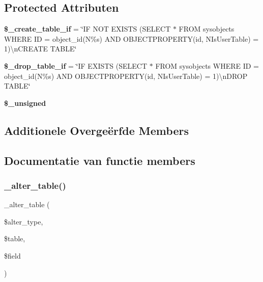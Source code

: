 \subsection*{Protected Attributen}
\begin{DoxyCompactItemize}
\item 
\mbox{\label{class_c_i___d_b__pdo__dblib__forge_a2f6484fcb8d1dc3eef67a637227cd583}} 
{\bfseries \$\+\_\+create\+\_\+table\+\_\+if} = \char`\"{}IF N\+OT E\+X\+I\+S\+TS (S\+E\+L\+E\+CT $\ast$ F\+R\+OM sysobjects W\+H\+E\+RE ID = object\+\_\+id(N\textquotesingle{}\%s\textquotesingle{}) A\+ND O\+B\+J\+E\+C\+T\+P\+R\+O\+P\+E\+R\+TY(id, N\textquotesingle{}Is\+User\+Table\textquotesingle{}) = 1)\textbackslash{}n\+C\+R\+E\+A\+TE T\+A\+B\+LE\char`\"{}
\item 
\mbox{\label{class_c_i___d_b__pdo__dblib__forge_a92a8a9145a7fc91e252e58d019373581}} 
{\bfseries \$\+\_\+drop\+\_\+table\+\_\+if} = \char`\"{}IF E\+X\+I\+S\+TS (S\+E\+L\+E\+CT $\ast$ F\+R\+OM sysobjects W\+H\+E\+RE ID = object\+\_\+id(N\textquotesingle{}\%s\textquotesingle{}) A\+ND O\+B\+J\+E\+C\+T\+P\+R\+O\+P\+E\+R\+TY(id, N\textquotesingle{}Is\+User\+Table\textquotesingle{}) = 1)\textbackslash{}n\+D\+R\+OP T\+A\+B\+LE\char`\"{}
\item 
{\bfseries \$\+\_\+unsigned}
\end{DoxyCompactItemize}
\subsection*{Additionele Overge\"{e}rfde Members}


\subsection{Documentatie van functie members}
\mbox{\label{class_c_i___d_b__pdo__dblib__forge_a41c6cae02f2fda8b429ad0afb9509426}} 
\subsubsection{\texorpdfstring{\_alter\_table()}{\_alter\_table()}}
{\footnotesize\ttfamily \+\_\+alter\+\_\+table (\begin{DoxyParamCaption}\item[{}]{\$alter\+\_\+type,  }\item[{}]{\$table,  }\item[{}]{\$field }\end{DoxyParamCaption})\hspace{0.3cm}{\ttfamily [protected]}}

